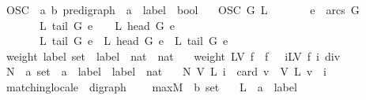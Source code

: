 \begin{isabellebody}
\ OSC\ {\isacharcolon}{\isacharcolon}\ {\isachardoublequoteopen}{\isacharparenleft}{\isacharprime}a{\isacharcomma}\ {\isacharprime}b{\isacharparenright}\ pre{\isacharunderscore}digraph\ {\isasymRightarrow}\ {\isacharparenleft}{\isacharprime}a\ {\isasymRightarrow}\ label{\isacharparenright}\ {\isasymRightarrow}\ bool{\isachardoublequoteclose}\ \isanewline
\ \ {\isachardoublequoteopen}OSC\ G\ L\ {\isacharequal}\ {\isacharparenleft}\isanewline
\ \ \ \ \ {\isasymforall}e\ {\isasymin}\ arcs\ G{\isachardot}\isanewline
\ \ \ \ \ \ \ L\ {\isacharparenleft}tail\ G\ e{\isacharparenright}\ {\isacharequal}\ {}\ {\isasymor}\ L\ {\isacharparenleft}head\ G\ e{\isacharparenright}\ {\isacharequal}\ {}\ {\isasymor}\ \isanewline
\ \ \ \ \ \ \ L\ {\isacharparenleft}tail\ G\ e{\isacharparenright}\ {\isacharequal}\ L\ {\isacharparenleft}head\ G\ e{\isacharparenright}\ {\isasymand}\ L\ {\isacharparenleft}tail\ G\ e{\isacharparenright}\ {\isasymge}\ {}{\isacharparenright}{\isachardoublequoteclose}\isanewline
\isanewline
{}\isamarkupfalse%
\ weight{\isacharcolon}{\isacharcolon}\ {\isachardoublequoteopen}label\ set\ {\isasymRightarrow}\ {\isacharparenleft}label\ {\isasymRightarrow}\ nat{\isacharparenright}\ {\isasymRightarrow}\ nat{\isachardoublequoteclose}\ \isanewline
\ \ {\isachardoublequoteopen}weight\ LV\ f\ {\isasymequiv}\ f\ {}\ {\isacharplus}\ {\isacharparenleft}{\isasymSum}i{\isasymin}LV{\isachardot}\ {\isacharparenleft}f\ i{\isacharparenright}\ div\ {}{\isacharparenright}{\isachardoublequoteclose}\isanewline
\isanewline
{}\isamarkupfalse%
\ N\ {\isacharcolon}{\isacharcolon}\ {\isachardoublequoteopen}{\isacharprime}a\ set\ {\isasymRightarrow}\ {\isacharparenleft}{\isacharprime}a\ {\isasymRightarrow}\ label{\isacharparenright}\ {\isasymRightarrow}\ label\ {\isasymRightarrow}\ nat{\isachardoublequoteclose}\ \isanewline
\ \ {\isachardoublequoteopen}N\ V\ L\ i\ {\isasymequiv}\ card\ {\isacharbraceleft}v\ {\isasymin}\ V{\isachardot}\ L\ v\ {\isacharequal}\ i{\isacharbraceright}{\isachardoublequoteclose}\isanewline
\isanewline
{}\isamarkupfalse%
\ matching{\isacharunderscore}locale\ {\isacharequal}\ digraph\ {\isacharplus}\isanewline
\ \ \ maxM\ {\isacharcolon}{\isacharcolon}\ {\isachardoublequoteopen}{\isacharprime}b\ set{\isachardoublequoteclose}\isanewline
\ \ \ L\ {\isacharcolon}{\isacharcolon}\ {\isachardoublequoteopen}{\isacharprime}a\ {\isasymRightarrow}\ label{\isachardoublequoteclose}\isanewline

\end{isabellebody}
